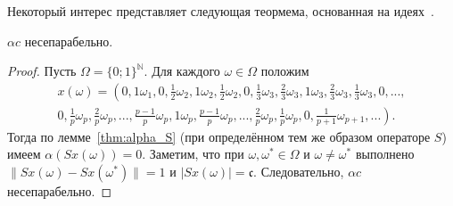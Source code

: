Некоторый интерес представляет следующая теормема,
основанная на идеях~\cite{usachev2009_phd_vsu}.

\begin{theorem}
	$\alpha c$ несепарабельно.
\end{theorem}

\begin{proof}
	Пусть $\Omega = \{0;1\}^{\mathbb{N}}$.
	Для каждого $\omega\in\Omega$ положим
	\begin{multline}
		\label{eq:x_omega_alpha_c}
		x(\omega)=\left(
			0, 1\omega_1,
			0, \frac{1}{2}\omega_2, 1\omega_2, \frac{1}{2}\omega_2,
			0, \frac{1}{3}\omega_3, \frac{2}{3}\omega_3, 1\omega_3, \frac{2}{3}\omega_3, \frac{1}{3}\omega_3,
			0, ...,
		\right. \\ \left.
			0, \frac{1}{p}\omega_p, \frac{2}{p}\omega_p, ..., \frac{p-1}{p}\omega_p, 1\omega_p,
				\frac{p-1}{p}\omega_p, ..., \frac{2}{p}\omega_p, \frac{1}{p}\omega_p,
			0, \frac{1}{p+1}\omega_{p+1}, ...
		\right).
	\end{multline}
	Тогда по лемме~\ref{thm:alpha_S} (при определённом тем же образом операторе $S$) имеем
	$\alpha(Sx(\omega)) = 0$.
	Заметим, что при $\omega,\omega^* \in \Omega$ и $\omega\neq\omega^*$ выполнено
	$\|Sx(\omega)-Sx(\omega^*)\|=1$ и $|Sx(\omega)|=\mathfrak{c}$.
	Следовательно, $\alpha c$ несепарабельно.
\end{proof}


